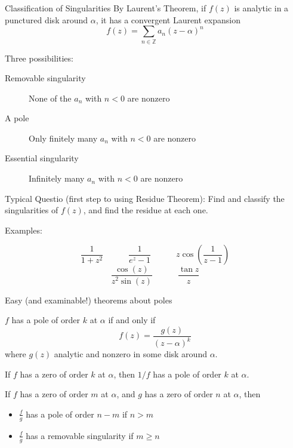 \documentclass{beamer}
\newcommand{\Z}{\mathbb{Z}}
\begin{document}
\begin{frame}{Classification of Singularities}
By Laurent's Theorem, if $f(z)$ is analytic in a punctured disk around $\alpha$, it has a convergent Laurent expansion
$$f(z)=\sum_{n\in\Z} a_n (z-\alpha)^n$$
\begin{block}{Three possibilities:}
\begin{description}
   \item[Removable singularity] None of the $a_n$ with $n<0$ are nonzero
       \item[A pole] Only finitely many $a_n$ with $n<0$ are nonzero
    \item[Essential singularity] Infinitely many $a_n$ with $n<0$ are nonzero

\end{description}
\end{block}

\begin{block}{Typical Questio (first step to using Residue Theorem):}
Find and classify the singularities of $f(z)$, and find the residue at each one.
\end{block}

\end{frame}


\begin{frame}{Examples:}

  
   $$\frac{1}{1+z^2} \quad\quad\quad \frac{1}{e^z-1}\quad\quad\quad z\cos\left(\frac{1}{z-1}\right)$$
    $$\frac{\cos(z)}{z^2\sin(z)} \quad\quad\quad \frac{\tan{z}}{z}$$  

      
  


\end{frame}  

\begin{frame}{Easy (and examinable!) theorems about poles}
\begin{theorem} $f$ has a pole of order $k$ at $\alpha$ if and only if $$f(z)=\frac{g(z)}{(z-\alpha)^k}$$ where $g(z)$ analytic and nonzero in some disk around $\alpha$.
\end{theorem}

\begin{theorem} If $f$ has a zero of order $k$ at $\alpha$, then $1/f$ has a pole of order $k$ at $\alpha$.
\end{theorem}

\begin{corollary}If $f$ has a zero of order $m$ at $\alpha$, and $g$ has a zero of order $n$ at $\alpha$, then
\begin{itemize}
    \item $\frac{f}{g}$ has a pole of order $n-m$ if $n>m$
    \item $\frac{f}{g}$ has a removable singularity if $m\geq n$
\end{itemize}
\end{corollary}
\end{frame}
\end{document}
